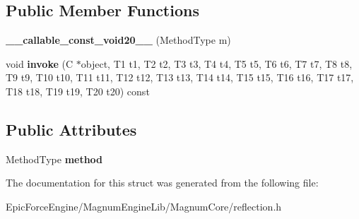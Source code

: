 \subsection*{Public Member Functions}
\begin{DoxyCompactItemize}
\item 
{\bfseries \+\_\+\+\_\+callable\+\_\+const\+\_\+void20\+\_\+\+\_\+} (Method\+Type m)\hypertarget{structagm_1_1reflection_1_1____callable__const__void20_____a5f1a09ae8898b35fd22c69476e9833f6}{}\label{structagm_1_1reflection_1_1____callable__const__void20_____a5f1a09ae8898b35fd22c69476e9833f6}

\item 
void {\bfseries invoke} (C $\ast$object, T1 t1, T2 t2, T3 t3, T4 t4, T5 t5, T6 t6, T7 t7, T8 t8, T9 t9, T10 t10, T11 t11, T12 t12, T13 t13, T14 t14, T15 t15, T16 t16, T17 t17, T18 t18, T19 t19, T20 t20) const \hypertarget{structagm_1_1reflection_1_1____callable__const__void20_____a5ab1006a3b5eed82fec5382fc4e36b29}{}\label{structagm_1_1reflection_1_1____callable__const__void20_____a5ab1006a3b5eed82fec5382fc4e36b29}

\end{DoxyCompactItemize}
\subsection*{Public Attributes}
\begin{DoxyCompactItemize}
\item 
Method\+Type {\bfseries method}\hypertarget{structagm_1_1reflection_1_1____callable__const__void20_____ac44ca94be10a52fa72e377d70d43f4b1}{}\label{structagm_1_1reflection_1_1____callable__const__void20_____ac44ca94be10a52fa72e377d70d43f4b1}

\end{DoxyCompactItemize}


The documentation for this struct was generated from the following file\+:\begin{DoxyCompactItemize}
\item 
Epic\+Force\+Engine/\+Magnum\+Engine\+Lib/\+Magnum\+Core/reflection.\+h\end{DoxyCompactItemize}
